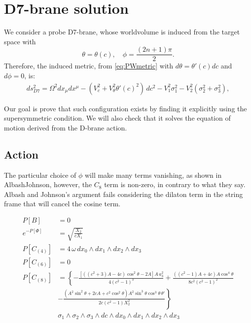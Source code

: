 \section{D7-brane solution}

We consider a probe D7-brane, whose worldvolume is induced from the target space with 
\begin{equation}
 \theta = \theta(c), \quad \phi=\frac{(2 n + 1)\pi}{2}.
\end{equation}
Therefore, the induced metric, from \eqref{eq:PWmetric} with $d\theta = \theta'(c) dc$ and $d\phi=0$, is:
\begin{align}\label{eq:PWmetric}
ds_{D7}^2 =
\Omega^2 dx_\mu dx^\mu 
- (V_c^2 +V_\theta^2 \theta'(c)^2)\, dc^2 - V_1^2 \sigma_1^2 - V_2^2 (\sigma_2^2 + \sigma_3^2),
\end{align}

Our goal is prove that such configuration exists by finding it explicitly using the supersymmetric condition. 
We will also check that it solves the equation of motion derived from the D-brane action.

\subsection{Action}


The particular choice of $\phi$ will make many terms vanishing, as shown in AlbashJohnson, however, the $C_8$ term is non-zero, in contrary to what they say. 
Albash and Johnson's argument fails considering the dilaton term in the string frame that will cancel the cosine term.

\begin{align*}
P[B] & = 0 \\
% 
e^{-P[\Phi]} &=\sqrt{\frac{X_2}{c X_1}}\\
%
P[C_{(4)}] &= 4 \, \omega \, dx_0\wedge dx_1\wedge dx_2\wedge dx_3 \\
%
P[C_{(6)}] &= 0\\
%
P[C_{(8)}] &=
 \left\{
-\frac{\left[\left(\left(c^2+3\right) A-4 c\right) \cos^2\theta -2 A\right]A \, a_3^2 }{4 \left(c^2-1\right)^3}+\frac{((c^2-1) A+4 c)A \cos^4\theta}{8 c^2 \left(c^2-1\right)^2}
\right.\\
&\left.
-\frac{\left(A^2 \sin^2\theta +2 c A+c^2 \cos^2\theta \right) A^2 \sin^3\theta \cos^3\theta \, \theta'}{2 c \left(c^2-1\right)  X_2^2}
\right\}\\
&\sigma_1\wedge \sigma_2\wedge \sigma_3\wedge dc\wedge dx_0\wedge dx_1\wedge dx_2\wedge dx_3
\end{align*}

